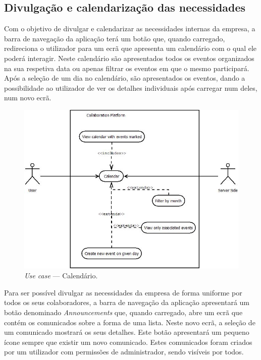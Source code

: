 \subsection{Divulgação e calendarização das necessidades}

Com o objetivo de divulgar e calendarizar as necessidades internas da empresa, a barra de navegação da aplicação terá um botão que, quando carregado, 
redireciona o utilizador para um ecrã que apresenta um calendário com o qual ele poderá interagir. 
Neste calendário são apresentados todos os eventos organizados na sua respetiva data ou apenas filtrar os eventos em que o mesmo participará. 
Após a seleção de um dia no calendário, são apresentados os eventos, dando a possibilidade ao utilizador de ver os detalhes individuais após carregar num deles, 
num novo ecrã.

\begin{figure}[H]
    \centering
    \includegraphics[scale=0.6]{figures/Calendar use case.jpeg}
    \caption{\textit{Use case} --- Calendário.}\label{fig:uc:calendar}
\end{figure}

Para ser possível divulgar as necessidades da empresa de forma uniforme por todos os seus colaboradores, a barra de navegação da aplicação apresentará 
um botão denominado \textit{Announcements} que, quando carregado, abre um ecrã que contém os comunicados sobre a forma de uma lista. 
Neste novo ecrã, a seleção de um comunicado mostrará os seus detalhes. 
Este botão apresentará um pequeno ícone sempre que existir um novo comunicado. 
Estes comunicados foram criados por um utilizador com permissões de administrador, sendo visíveis por todos.


